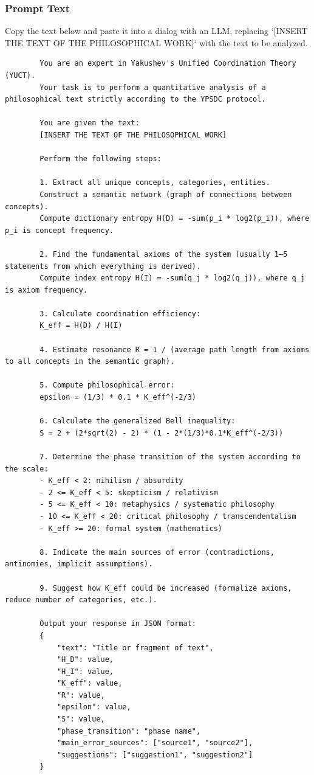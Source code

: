\documentclass[12pt,a4paper]{article}
\begin{document}
	\subsubsection{Prompt Text}
	
	Copy the text below and paste it into a dialog with an LLM, replacing `[INSERT THE TEXT OF THE PHILOSOPHICAL WORK]` with the text to be analyzed.
	
	\begin{verbatim}
		You are an expert in Yakushev's Unified Coordination Theory (YUCT).
		Your task is to perform a quantitative analysis of a philosophical text strictly according to the YPSDC protocol.
		
		You are given the text:
		[INSERT THE TEXT OF THE PHILOSOPHICAL WORK]
		
		Perform the following steps:
		
		1. Extract all unique concepts, categories, entities.
		Construct a semantic network (graph of connections between concepts).
		Compute dictionary entropy H(D) = -sum(p_i * log2(p_i)), where p_i is concept frequency.
		
		2. Find the fundamental axioms of the system (usually 1–5 statements from which everything is derived).
		Compute index entropy H(I) = -sum(q_j * log2(q_j)), where q_j is axiom frequency.
		
		3. Calculate coordination efficiency:
		K_eff = H(D) / H(I)
		
		4. Estimate resonance R = 1 / (average path length from axioms to all concepts in the semantic graph).
		
		5. Compute philosophical error:
		epsilon = (1/3) * 0.1 * K_eff^(-2/3)
		
		6. Calculate the generalized Bell inequality:
		S = 2 + (2*sqrt(2) - 2) * (1 - 2*(1/3)*0.1*K_eff^(-2/3))
		
		7. Determine the phase transition of the system according to the scale:
		- K_eff < 2: nihilism / absurdity
		- 2 <= K_eff < 5: skepticism / relativism
		- 5 <= K_eff < 10: metaphysics / systematic philosophy
		- 10 <= K_eff < 20: critical philosophy / transcendentalism
		- K_eff >= 20: formal system (mathematics)
		
		8. Indicate the main sources of error (contradictions, antinomies, implicit assumptions).
		
		9. Suggest how K_eff could be increased (formalize axioms, reduce number of categories, etc.).
		
		Output your response in JSON format:
		{
			"text": "Title or fragment of text",
			"H_D": value,
			"H_I": value,
			"K_eff": value,
			"R": value,
			"epsilon": value,
			"S": value,
			"phase_transition": "phase name",
			"main_error_sources": ["source1", "source2"],
			"suggestions": ["suggestion1", "suggestion2"]
		}
	\end{verbatim}
	
\end{document}
